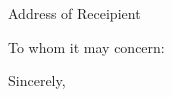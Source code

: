 \documentclass[11pt]{letter}
\begin{document}
\begin{letter}
{Address of Receipient\\}

\opening{To whom it may concern:}


\closing{Sincerely,}


\end{letter}
\end{document}

